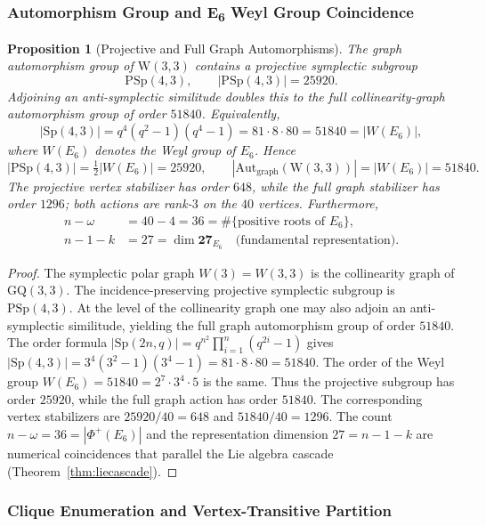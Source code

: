 \documentclass[12pt,a4paper]{article}
\newtheorem{proposition}[theorem]{Proposition}
\newcommand{\W}{\mathrm{W}(3,3)}
\begin{document}
\subsubsection{Automorphism Group and E\protect\textsubscript{6} Weyl Group Coincidence}

\begin{proposition}[Projective and Full Graph Automorphisms]\label{prop:automorphism}
The graph automorphism group of $\W$ contains a projective symplectic subgroup
\[
  \mathrm{PSp}(4,3),\qquad |\mathrm{PSp}(4,3)| = 25920.
\]
Adjoining an anti-symplectic similitude doubles this to the full collinearity-graph
automorphism group of order $51840$. Equivalently,
\[
  |\mathrm{Sp}(4,3)| = q^4(q^2-1)(q^4-1) = 81\cdot 8\cdot 80 = 51840 = |W(E_6)|,
\]
where $W(E_6)$ denotes the Weyl group of $E_6$.  Hence
\[
  |\mathrm{PSp}(4,3)| = \tfrac{1}{2}|W(E_6)| = 25920,
  \qquad
  |\mathrm{Aut}_{\mathrm{graph}}(\W)| = |W(E_6)| = 51840.
\]
The projective vertex stabilizer has order $648$, while the full graph stabilizer
has order $1296$; both actions are rank-$3$ on the $40$ vertices.  Furthermore,
\begin{align}
  n - \omega &= 40 - 4 = 36 = \#\{\text{positive roots of }E_6\}, \\
  n - 1 - k  &= 27 = \dim\mathbf{27}_{E_6}  \quad\text{(fundamental representation).}
\end{align}
\end{proposition}

\begin{proof}
The symplectic polar graph $W(3) = W(3,3)$ is the collinearity graph of $\mathrm{GQ}(3,3)$.
The incidence-preserving projective symplectic subgroup is $\mathrm{PSp}(4,3)$.
At the level of the collinearity graph one may also adjoin an anti-symplectic
similitude, yielding the full graph automorphism group of order $51840$.
The order formula $|\mathrm{Sp}(2n,q)| = q^{n^2}\prod_{i=1}^n(q^{2i}-1)$ gives
$|\mathrm{Sp}(4,3)| = 3^4(3^2-1)(3^4-1) = 81\cdot 8\cdot 80 = 51840$.
The order of the Weyl group $W(E_6) = 51840 = 2^7\cdot 3^4\cdot 5$ is the same.
Thus the projective subgroup has order $25920$, while the full graph action has
order $51840$. The corresponding vertex stabilizers are $25920/40 = 648$ and
$51840/40 = 1296$.
The count $n - \omega = 36 = |\Phi^+(E_6)|$ and the representation dimension $27 = n-1-k$
are numerical coincidences that parallel the Lie algebra cascade
(Theorem~\ref{thm:liecascade}).
\end{proof}

\subsubsection{Clique Enumeration and Vertex-Transitive Partition}
\end{document}
